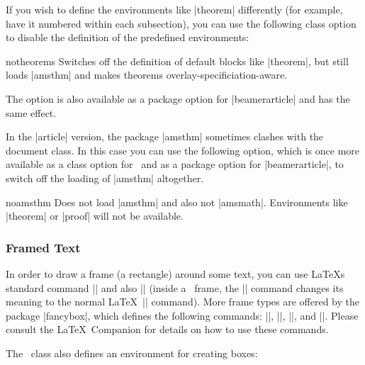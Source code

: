 If you wish to define the environments like |theorem| differently (for
example, have it numbered within each subsection), you can use the
following class option to disable the definition of the predefined
environments: 

\begin{classoption}{{notheorems}}
  Switches off the definition of default blocks like |theorem|, but
  still loads |amsthm| and makes theorems  
  overlay-specificiation-aware.
\end{classoption}

The option is also available as a package option for
|beamerarticle| and has the same effect.

\articlenote
In the |article| version, the package |amsthm| sometimes clashes with
the document class. In this case you can use the following option,
which is once more available as a class option for \beamer\ and as a
package option for |beamerarticle|, to switch off the loading of
|amsthm| altogether. 

\begin{classoption}{{noamsthm}}
  Does not load |amsthm| and also not |amsmath|. Environments like
  |theorem| or |proof| will not be available.
\end{classoption}




\subsubsection{Framed Text}

In order to draw a frame (a rectangle) around some text, you can use
\LaTeX s standard command |\fbox| and also |\frame| (inside a \beamer{}, the |\frame| command changes its meaning to the normal \LaTeX\
|\frame| command). More frame types are offered by the
package |fancybox|, which defines the following commands:
|\shadowbox|, |\doublebox|, |\ovalbox|, and |\Ovalbox|. Please consult
the \LaTeX\ Companion for details on how to use these commands.

The \beamer\ class also defines an environment for creating boxes:

